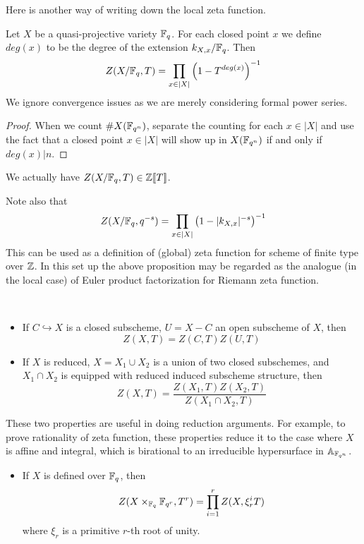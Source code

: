 Here is another way of writing down the local zeta function.
\begin{prop}
Let $X$ be a quasi-projective variety $\mathbb{F}_q$. For each closed point $x$ we define $deg(x)$ to be the degree of the extension $k_{X,x}/\mathbb{F}_q$. Then
\[
Z(X/\mathbb{F}_q, T) = \prod_{x \in |X|} \left(1 - T^{deg(x)}\right)^{-1}
\]
We ignore convergence issues as we are merely considering formal power series.
\end{prop}
\begin{proof}
When we count $\#X(\mathbb{F}_{q^n})$, separate the counting for each $x \in |X|$ and use the fact that a closed point $x \in |X|$ will show up in $X(\mathbb{F}_{q^n})$ if and only if $deg(x) | n$.
\end{proof}
\begin{cor}
We actually have $Z(X/\mathbb{F}_q, T) \in \mathbb{Z}[\![T]\!]$.
\end{cor}
\begin{rem}
Note also that 
\[
Z(X/\mathbb{F}_q, q^{-s}) = \prod_{x \in |X|} \left(1 - |k_{X,x}|^{-s}\right)^{-1}
\]
This can be used as a definition of (global) zeta function for scheme of finite type over $\mathbb{Z}$. In this set up the above proposition may be regarded as the analogue (in the local case) of Euler product factorization for Riemann zeta function.
\end{rem}
\begin{prop} \hspace{1mm} \\
\begin{itemize}
    \item If $C \hookrightarrow X$ is a closed subscheme, $U = X - C$ an open subscheme of $X$, then 
    \[
    Z(X,T) = Z(C,T)Z(U,T)
    \]
    \item If $X$ is reduced, $X = X_1 \cup X_2$ is a union of two closed subschemes, and $X_1 \cap X_2$ is equipped with reduced induced subscheme structure, then
    \[
    Z(X,T) = \frac{Z(X_1,T)Z(X_2,T)}{Z(X_1 \cap X_2,T)}
    \]
\end{itemize}
These two properties are useful in doing reduction arguments. For example, to prove rationality of zeta function, these properties reduce it to the case where $X$ is affine and integral, which is birational to an irreducible hypersurface in $\mathbb{A}_{\mathbb{F}_{q^n}}$.
\begin{itemize}[resume]
    \item If $X$ is defined over $\mathbb{F}_q$, then
    \[
    Z(X \times_{\mathbb{F}_q} \mathbb{F}_{q^r}, T^r) = \prod_{i=1}^r Z(X, \xi_r^i T)
    \]
    where $\xi_r$ is a primitive $r$-th root of unity.
\end{itemize}
\end{prop}
